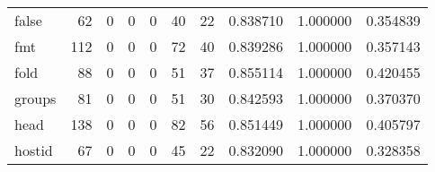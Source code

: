 \begin{tabular}{lrrrrrrrrr}
false     &                                    62 &                                                  0 &                                                  0 &                                                  0 &                                                 40 &                                                 22 &                                           0.838710 &                               1.000000 &                             0.354839 \\
fmt       &                                   112 &                                                  0 &                                                  0 &                                                  0 &                                                 72 &                                                 40 &                                           0.839286 &                               1.000000 &                             0.357143 \\
fold      &                                    88 &                                                  0 &                                                  0 &                                                  0 &                                                 51 &                                                 37 &                                           0.855114 &                               1.000000 &                             0.420455 \\
groups    &                                    81 &                                                  0 &                                                  0 &                                                  0 &                                                 51 &                                                 30 &                                           0.842593 &                               1.000000 &                             0.370370 \\
head      &                                   138 &                                                  0 &                                                  0 &                                                  0 &                                                 82 &                                                 56 &                                           0.851449 &                               1.000000 &                             0.405797 \\
hostid    &                                    67 &                                                  0 &                                                  0 &                                                  0 &                                                 45 &                                                 22 &                                           0.832090 &                               1.000000 &                             0.328358 \\

\end{tabular}
